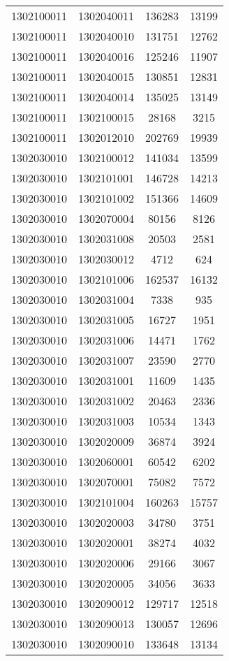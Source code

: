 \begin{longtable}[h]{llcc}
		1302100011 & 1302040011 & 136283 & 13199\\
		1302100011 & 1302040010 & 131751 & 12762\\
		1302100011 & 1302040016 & 125246 & 11907\\
		1302100011 & 1302040015 & 130851 & 12831\\
		1302100011 & 1302040014 & 135025 & 13149\\
		1302100011 & 1302100015 & 28168 & 3215\\
		1302100011 & 1302012010 & 202769 & 19939\\
		1302030010 & 1302100012 & 141034 & 13599\\
		1302030010 & 1302101001 & 146728 & 14213\\
		1302030010 & 1302101002 & 151366 & 14609\\
		1302030010 & 1302070004 & 80156 & 8126\\
		1302030010 & 1302031008 & 20503 & 2581\\
		1302030010 & 1302030012 & 4712 & 624\\
		1302030010 & 1302101006 & 162537 & 16132\\
		1302030010 & 1302031004 & 7338 & 935\\
		1302030010 & 1302031005 & 16727 & 1951\\
		1302030010 & 1302031006 & 14471 & 1762\\
		1302030010 & 1302031007 & 23590 & 2770\\
		1302030010 & 1302031001 & 11609 & 1435\\
		1302030010 & 1302031002 & 20463 & 2336\\
		1302030010 & 1302031003 & 10534 & 1343\\
		1302030010 & 1302020009 & 36874 & 3924\\
		1302030010 & 1302060001 & 60542 & 6202\\
		1302030010 & 1302070001 & 75082 & 7572\\
		1302030010 & 1302101004 & 160263 & 15757\\
		1302030010 & 1302020003 & 34780 & 3751\\
		1302030010 & 1302020001 & 38274 & 4032\\
		1302030010 & 1302020006 & 29166 & 3067\\
		1302030010 & 1302020005 & 34056 & 3633\\
		1302030010 & 1302090012 & 129717 & 12518\\
		1302030010 & 1302090013 & 130057 & 12696\\
		1302030010 & 1302090010 & 133648 & 13134\\

\end{longtable}
